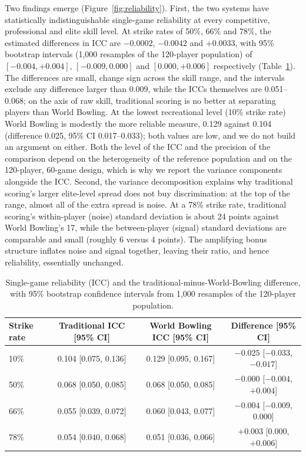 \documentclass[USenglish]{article}
\theoremstyle{dgthm}
\theoremstyle{dgdef}
\begin{document}
Two findings emerge (Figure~\ref{fig:reliability}). First, the two systems have statistically indistinguishable single-game reliability at every competitive, professional and elite skill level. At strike rates of 50\%, 66\% and 78\%, the estimated differences in ICC are $-0.0002$, $-0.0042$ and $+0.0033$, with 95\% bootstrap intervals (1,000 resamples of the 120-player population) of $[-0.004, +0.004]$, $[-0.009, 0.000]$ and $[0.000, +0.006]$ respectively (Table~\ref{tab:reliabilityci}). The differences are small, change sign across the skill range, and the intervals exclude any difference larger than 0.009, while the ICCs themselves are 0.051--0.068; on the axis of raw skill, traditional scoring is no better at separating players than World Bowling. At the lowest recreational level (10\% strike rate) World Bowling is modestly the more reliable measure, 0.129 against 0.104 (difference 0.025, 95\% CI 0.017--0.033); both values are low, and we do not build an argument on either. Both the level of the ICC and the precision of the comparison depend on the heterogeneity of the reference population and on the 120-player, 60-game design, which is why we report the variance components alongside the ICC. Second, the variance decomposition explains why traditional scoring's larger elite-level spread does not buy discrimination: at the top of the range, almost all of the extra spread is noise. At a 78\% strike rate, traditional scoring's within-player (noise) standard deviation is about 24 points against World Bowling's 17, while the between-player (signal) standard deviations are comparable and small (roughly 6 versus 4 points). The amplifying bonus structure inflates noise and signal together, leaving their ratio, and hence reliability, essentially unchanged.

\begin{table}[!ht]
\caption{Single-game reliability (ICC) and the traditional-minus-World-Bowling difference, with 95\% bootstrap confidence intervals from 1,000 resamples of the 120-player population.}
\begin{tabular}{lccc}
Strike rate & Traditional ICC [95\% CI] & World Bowling ICC [95\% CI] & Difference [95\% CI] \\ \midrule
10\% & 0.104 [0.075, 0.136] & 0.129 [0.095, 0.167] & $-0.025$ [$-0.033$, $-0.017$] \\
50\% & 0.068 [0.050, 0.085] & 0.068 [0.050, 0.085] & $-0.000$ [$-0.004$, $+0.004$] \\
66\% & 0.055 [0.039, 0.072] & 0.060 [0.043, 0.077] & $-0.004$ [$-0.009$, $0.000$] \\
78\% & 0.054 [0.040, 0.068] & 0.051 [0.036, 0.066] & $+0.003$ [$0.000$, $+0.006$] \\
\end{tabular}
\label{tab:reliabilityci}
\end{table}
\end{document}
